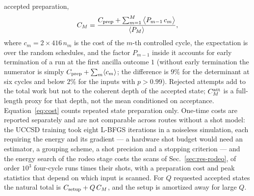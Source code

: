 \documentclass[
  aps,            %
  prc,            %
  reprint,        %
  superscriptaddress,
  floatfix,
  nofootinbib
]{revtex4-2}
\begin{document}
accepted preparation,
\begin{equation}
  C_M=\frac{C_{\rm prep}+\sum_{m=1}^{M}\big\langle P_{m-1}\,c_m\big\rangle}{\langle P_M\rangle},
  \label{eq:cost}
\end{equation}
where $c_m=2\times416\,n_m$ is the cost of the $m$-th controlled cycle, the
expectation is over the random schedules, and the factor $P_{m-1}$ inside it
accounts for early termination of a run at the first ancilla outcome $1$
(without early termination the numerator is simply
$C_{\rm prep}+\sum_m\langle c_m\rangle$; the difference is $9\%$ for the
determinant at six cycles and below $2\%$ for the inputs with $p>0.99$).
Rejected attempts add to the total work but not to the coherent depth of
the accepted state; $C^{\rm att}_M$ is a full-length proxy for that depth,
not the mean conditioned on acceptance.  Equation~\eqref{eq:cost} counts
repeated state preparation only.  One-time costs are reported separately
and are not comparable across routes without a shot model: the UCCSD
training took eight L-BFGS iterations in a noiseless simulation, each
requiring the energy and its gradient --- a hardware shot budget would need
an estimator, a grouping scheme, a shot precision and a stopping criterion
--- and the energy search of the rodeo stage costs the scans of
Sec.~\ref{sec:res-rodeo}, of order $10^{3}$ four-cycle runs times their
shots, with a preparation cost and peak statistics that depend on which
input is scanned.  For $Q$ requested accepted states the natural total is
$C_{\rm setup}+Q\,C_M$, and the setup is amortized away for large $Q$.
\end{document}
